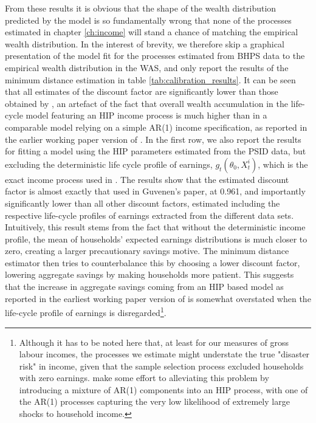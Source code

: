 From these results
it is obvious that the shape of the wealth distribution predicted by the model
is so fundamentally wrong that none of the processes estimated in chapter 
\ref{ch:income} will stand a chance of matching the empirical wealth distribution.
In the interest of brevity, we therefore skip a graphical presentation of the model
fit for the processes estimated from BHPS data to the empirical wealth distribution
in the WAS, and only report the results of the minimum distance estimation in 
table \ref{tab:calibration_results}. It can be seen that all estimates of the 
discount factor are significantly lower than those obtained by \citet{HintermaierKoeniger2011},
an artefact of the fact that overall wealth accumulation in the life-cycle model
featuring an HIP income process is much higher than in a comparable model 
relying on a simple AR(1) income specification, as reported in the earlier 
working paper version of \citet{Guvenen2007}. In the first row, we also report 
the results for fitting a model using the HIP parameters estimated from the PSID
data, but excluding the deterministic life cycle profile of earnings, 
$g_t(\theta_0, X_t^i)$, which is the exact income process used in \citet{Guvenen2007}.
The results show that the estimated discount factor is almost exactly that 
used in Guvenen's paper, at 0.961, and importantly significantly lower than 
all other discount factors, estimated including the respective life-cycle profiles
of earnings extracted from the different data sets. Intuitively, this result
stems from the fact that without the deterministic income profile, the mean 
of households' expected earnings distributions is much closer to zero, creating
a larger precautionary savings motive. The minimum distance estimator then tries
to counterbalance this by choosing a lower discount factor, lowering aggregate
savings by making households more patient. This suggests that the increase in 
aggregate savings coming from an HIP based model as reported in the earliest 
working paper version of \citet{Guvenen2007} is somewhat overstated when 
the life-cycle profile of earnings is disregarded\footnote{Although it has to 
be noted here that, at least for our measures of gross labour incomes, the processes
we estimate might understate the true "disaster risk" in income, given that the 
sample selection process excluded households with zero earnings. \citet{GKOS2015}
make some effort to alleviating this problem by introducing a mixture of AR(1)
components into an HIP process, with one of the AR(1) processes capturing the 
very low likelihood of extremely large shocks to household income.}. 

